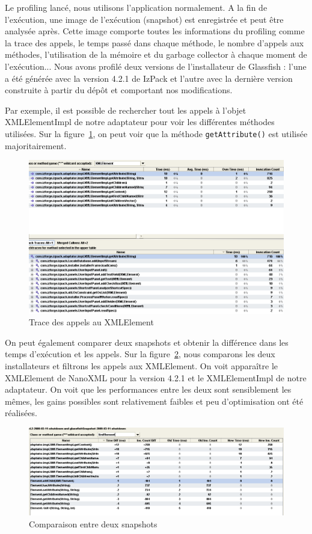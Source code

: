Le profiling lancé, nous utilisons l'application normalement.
A la fin de l'exécution, une image de l'exécution (snapshot) est enregistrée et peut être analysée après.
Cette image comporte toutes les informations du profiling comme la trace des appels, le temps passé dans chaque méthode, le nombre d'appels aux méthodes, l'utilisation de la mémoire et du garbage collector à chaque moment de l'exécution...
Nous avons profilé deux versions de l'installateur de Glassfish : l'une a été générée avec la version 4.2.1 de IzPack et l'autre avec la dernière version construite à partir du dépôt et comportant nos modifications.

Par exemple, il est possible de rechercher tout les appels à l'objet XMLElementImpl de notre adaptateur pour voir les différentes méthodes utilisées. Sur la figure~\ref{fig:yourkitXmlElement}, on peut voir que la méthode \verb|getAttribute()| est utilisée majoritairement.
\begin{figure}[H]
	\centering
	\includegraphics[width=1\textwidth]{../image/yourkitXmlElement.png}
	\caption{Trace des appels au XMLElement}
	\label{fig:yourkitXmlElement}
\end{figure}

On peut également comparer deux snapshots et obtenir la différence dans les temps d'exécution et les appels.
Sur la figure~\ref{fig:yourkitComparaison}, nous comparons les deux installateurs et filtrons les appels aux XMLElement.
On voit apparaître le XMLElement de NanoXML pour la version 4.2.1 et le XMLElementImpl de notre adaptateur.
On voit que les performances entre les deux sont sensiblement les mêmes, les gains possibles sont relativement faibles et peu d'optimisation ont été réalisées.
\begin{figure}[H]
	\centering
	\includegraphics[width=1\textwidth]{../image/yourkitComparaison.png}
	\caption{Comparaison entre deux snapshots}
	\label{fig:yourkitComparaison}
\end{figure}

